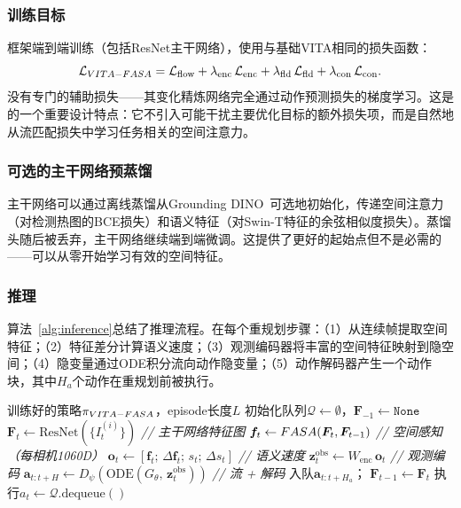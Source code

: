 \subsubsection{训练目标}

\method{}框架端到端训练（包括ResNet主干网络），使用与基础VITA相同的损失函数：
\begin{equation}
    \mathcal{L}_{VITA-FASA{}} = \mathcal{L}_{\text{flow}} + \lambda_{\text{enc}}\,\mathcal{L}_{\text{enc}} + \lambda_{\text{fld}}\,\mathcal{L}_{\text{fld}} + \lambda_{\text{con}}\,\mathcal{L}_{\text{con}}.
    \label{eq:total_loss}
\end{equation}
\fasa{}没有专门的辅助损失——其变化精炼网络完全通过动作预测损失的梯度学习。这是\fasa{}的一个重要设计特点：它不引入可能干扰主要优化目标的额外损失项，而是自然地从流匹配损失中学习任务相关的空间注意力。

\subsubsection{可选的主干网络预蒸馏}

主干网络可以通过离线蒸馏从Grounding DINO~\cite{liu2023grounding}可选地初始化，传递空间注意力（对检测热图的BCE损失）和语义特征（对Swin-T特征的余弦相似度损失）。蒸馏头随后被丢弃，主干网络继续端到端微调。这提供了更好的起始点但不是必需的——\fasa{}可以从零开始学习有效的空间特征。

\subsubsection{推理}

算法~\ref{alg:inference}总结了推理流程。在每个重规划步骤：（1）\fasa{}从连续帧提取空间特征；（2）特征差分计算语义速度；（3）观测编码器将丰富的空间特征映射到隐空间；（4）隐变量通过ODE积分流向动作隐变量；（5）动作解码器产生一个动作块，其中$H_a$个动作在重规划前被执行。

\begin{algorithm}[t]
\caption{\method{} 推理}
\label{alg:inference}
\begin{algorithmic}[1]
\REQUIRE 训练好的策略$\pi_{VITA-FASA{}}$，episode长度$L$
\STATE 初始化队列$\mathcal{Q} \leftarrow \emptyset$，$\bm{F}_{-1} \leftarrow \texttt{None}$
        \STATE $\bm{F}_t \leftarrow \text{ResNet}(\{I_t^{(i)}\})$ \hfill \textit{// 主干网络特征图}
        \STATE $\bm{f}_t \leftarrow FASA{}(\bm{F}_t, \bm{F}_{t-1})$ \hfill \textit{// 空间感知（每相机1060D）}
        \STATE $\bm{o}_t \leftarrow [\bm{f}_t;\, \Delta\bm{f}_t;\, s_t;\, \Delta s_t]$ \hfill \textit{// 语义速度}
        \STATE $\bm{z}_t^{\text{obs}} \leftarrow W_{\text{enc}}\, \bm{o}_t$ \hfill \textit{// 观测编码}
        \STATE $\bm{a}_{t:t+H} \leftarrow D_\psi\!\left(\text{ODE}(G_\theta,\, \bm{z}_t^{\text{obs}})\right)$ \hfill \textit{// 流 + 解码}
        \STATE 入队$\bm{a}_{t:t+H_a}$；\; $\bm{F}_{t-1} \leftarrow \bm{F}_t$
    \ENDIF
    \STATE 执行$a_t \leftarrow \mathcal{Q}.\text{dequeue}()$
\ENDFOR
\end{algorithmic}
\end{algorithm}
